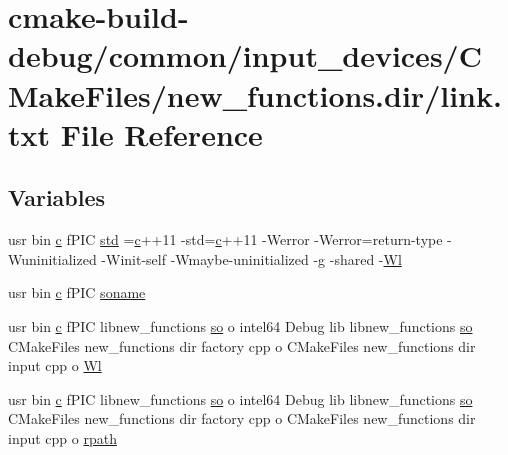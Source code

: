 \hypertarget{common_2input__devices_2CMakeFiles_2new__functions_8dir_2link_8txt}{}\section{cmake-\/build-\/debug/common/input\+\_\+devices/\+C\+Make\+Files/new\+\_\+functions.dir/link.txt File Reference}
\label{common_2input__devices_2CMakeFiles_2new__functions_8dir_2link_8txt}
\subsection*{Variables}
\begin{DoxyCompactItemize}
\item 
usr bin \hyperlink{CMakeCache_8txt_aac1d6a1710812201527c735f7c6afbaa}{c} f\+P\+IC \hyperlink{common_2input__devices_2CMakeFiles_2new__functions_8dir_2link_8txt_a5f87c8f8e33670f7c8c5221b6be1bcc4}{std} =\hyperlink{CMakeCache_8txt_aac1d6a1710812201527c735f7c6afbaa}{c}++11 -\/std=\hyperlink{CMakeCache_8txt_aac1d6a1710812201527c735f7c6afbaa}{c}++11 -\/Werror -\/Werror=return-\/type -\/Wuninitialized -\/Winit-\/self -\/Wmaybe-\/uninitialized -\/g -\/shared -\/\hyperlink{thirdparty_2extension_2CMakeFiles_2cpu__extension_8dir_2link_8txt_af9ccbf658ed2deb89d0d79f211e5b033}{Wl}
\item 
usr bin \hyperlink{CMakeCache_8txt_aac1d6a1710812201527c735f7c6afbaa}{c} f\+P\+IC \hyperlink{common_2input__devices_2CMakeFiles_2new__functions_8dir_2link_8txt_ab65a9b6457c4853ed17f89f945516e66}{soname}
\item 
usr bin \hyperlink{CMakeCache_8txt_aac1d6a1710812201527c735f7c6afbaa}{c} f\+P\+IC libnew\+\_\+functions \hyperlink{CMakeCache_8txt_aa98797039f48d335ee715de4cd92852f}{so} o intel64 Debug lib libnew\+\_\+functions \hyperlink{CMakeCache_8txt_aa98797039f48d335ee715de4cd92852f}{so} C\+Make\+Files new\+\_\+functions dir factory cpp o C\+Make\+Files new\+\_\+functions dir input cpp o \hyperlink{common_2input__devices_2CMakeFiles_2new__functions_8dir_2link_8txt_a343f4bbf39765d5b07355212d97d9ff9}{Wl}
\item 
usr bin \hyperlink{CMakeCache_8txt_aac1d6a1710812201527c735f7c6afbaa}{c} f\+P\+IC libnew\+\_\+functions \hyperlink{CMakeCache_8txt_aa98797039f48d335ee715de4cd92852f}{so} o intel64 Debug lib libnew\+\_\+functions \hyperlink{CMakeCache_8txt_aa98797039f48d335ee715de4cd92852f}{so} C\+Make\+Files new\+\_\+functions dir factory cpp o C\+Make\+Files new\+\_\+functions dir input cpp o \hyperlink{common_2input__devices_2CMakeFiles_2new__functions_8dir_2link_8txt_aaf81fb052dbb977f0e4f11ec26f06758}{rpath}
\end{DoxyCompactItemize}


